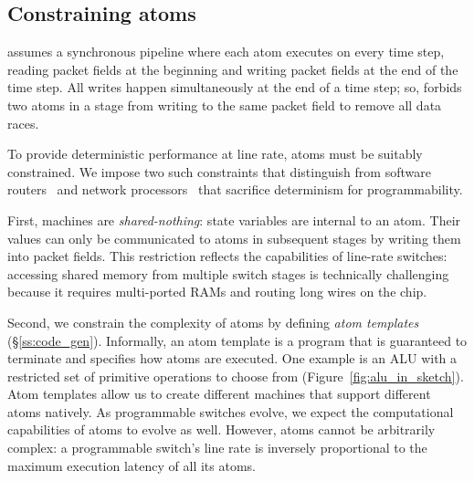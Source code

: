 \subsection{Constraining atoms}
\absmachine assumes a synchronous pipeline where each atom executes on every
time step, reading packet fields at the beginning and writing packet fields at
the end of the time step. All writes happen simultaneously at the end
of a time step; so, \absmachine forbids two atoms in a stage from writing to
the same packet field to remove all data races.

To provide deterministic performance at line rate, atoms must be suitably
constrained.  We impose two such constraints that distinguish \absmachine from
software routers~\cite{click} and network processors~\cite{ixp4xx} that
sacrifice determinism for programmability.

First, \absmachine machines are \textit{shared-nothing}: state variables are
internal to an atom. Their values can only be communicated to atoms in
subsequent stages by writing them into packet fields. This restriction reflects
the capabilities of line-rate switches: accessing shared memory from multiple
switch stages is technically challenging because it requires multi-ported RAMs
and routing long wires on the chip.

Second, we constrain the complexity of atoms by defining {\it atom templates}
(\S\ref{ss:code_gen}).  Informally, an atom template is a program that is
guaranteed to terminate and specifies how atoms are executed. One example is an
ALU with a restricted set of primitive operations to choose from
(Figure~\ref{fig:alu_in_sketch}). Atom templates allow us to create different
\absmachine machines that support different atoms natively. As programmable
switches evolve, we expect the computational capabilities of atoms to evolve as
well. However, atoms cannot be arbitrarily complex: a programmable switch's
line rate is inversely proportional to the maximum execution latency of all its
atoms.
